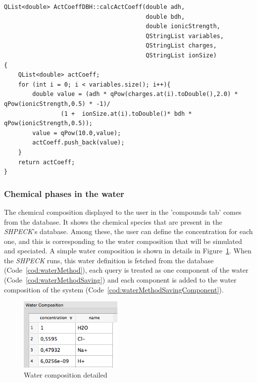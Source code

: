 \begin{minipage}{0.8\linewidth}
\begin{lstlisting}[frame=single, label=cod:debyeHueckelMethod, caption=Implementation of the Debye Hueckel method]
QList<double> ActCoeffDBH::calcActCoeff(double adh,
                                        double bdh,
                                        double ionicStrength,
                                        QStringList variables,
                                        QStringList charges,
                                        QStringList ionSize)
{
    QList<double> actCoeff;
    for (int i = 0; i < variables.size(); i++){
        double value = (adh * qPow(charges.at(i).toDouble(),2.0) * qPow(ionicStrength,0.5) * -1)/
                (1 +  ionSize.at(i).toDouble()* bdh * qPow(ionicStrength,0.5));
        value = qPow(10.0,value);
        actCoeff.push_back(value);
    }
    return actCoeff;
}

\end{lstlisting}
\end{minipage}

\subsubsection{Chemical phases in the water}
The chemical composition displayed to the user in the 'compounds tab' comes from the database. It shows the chemical species that are present in the \emph{SHPECK}'s database. Among these, the user can define the concentration for each one, and this is corresponding to the water composition that will be simulated and speciated. A simple water composition is shown in details in Figure~\ref{fig:waterCompositionDetail}. When the \emph{SHPECK} runs, this water definition is fetched from the database (Code~\ref{cod:waterMethod}), each query is treated as one component of the water (Code~\ref{cod:waterMethodSaving}) and each component is added to the water composition of the system (Code~\ref{cod:waterMethodSavingComponent}).

\begin{figure}[ht!]
\centering
\includegraphics[width=50mm]{figures/shpeck-waterComposition.png}
\caption{Water composition detailed}
\label{fig:waterCompositionDetail}
\end{figure}

